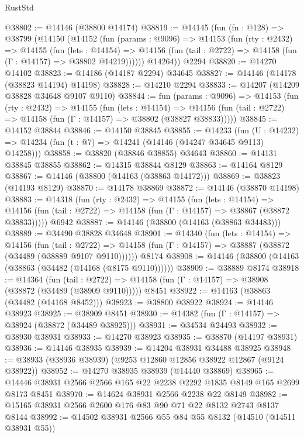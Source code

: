 \begin{lexlean}{RustStd}
\begin{coremodule}
@38802 := @14146 (@38800 @14174)
@38819 := @14145
    (fun (fn : @128) =>
    @38799
      (@14150
        (@14152
          (fun (params : @9096) =>
          @14153
            (fun (rty : @2432) =>
            @14155
              (fun (lets : @14154) =>
              @14156 (fun (tail : @2722) => @14158 (fun (Γ : @14157) => @38802 @14219))))))
        @14264))
    @2294
@38820 := @14270 @14102
@38823 := @14186 (@14187 @2294) @34645
@38827 := @14146 (@14178 (@38823 @14194) @14198)
@38828 := @14210 @2294
@38833 := @14207 (@14209 @38828 @34648 @9107 @9110)
@38844 := fun (params : @9096) =>
  @14153
    (fun (rty : @2432) =>
    @14155
      (fun (lets : @14154) =>
      @14156 (fun (tail : @2722) => @14158 (fun (Γ : @14157) => @38802 (@38827 @38833)))))
@38845 := @14152 @38844
@38846 := @14150 @38845
@38855 := @14233
    (fun (U : @14232) => @14234 (fun (t : @7) => @14241 (@14146 (@14247 @34645 @9113) @14258)))
@38858 := @38820 (@38846 @38855) @34643
@38860 := @14131 @38845 @38855
@38862 := @14315 @38844 @8129
@38863 := @14164 @8129
@38867 := @14146 (@38800 (@14163 (@38863 @14172)))
@38869 := @38823 (@14193 @8129)
@38870 := @14178 @38869
@38872 := @14146 (@38870 @14198)
@38883 := @14318
    (fun (rty : @2432) =>
    @14155
      (fun (lets : @14154) =>
      @14156 (fun (tail : @2722) => @14158 (fun (Γ : @14157) => @38867 (@38872 @38833)))))
    @6942
@38887 := @14146 (@38800 (@14163 (@38863 @34483)))
@38889 := @34490 @38828 @34648
@38901 := @14340
    (fun (lets : @14154) =>
    @14156
      (fun (tail : @2722) =>
      @14158 (fun (Γ : @14157) => @38887 (@38872 (@34489 (@38889 @9107 @9110))))))
    @8174
@38908 := @14146 (@38800 (@14163 (@38863 (@34482 (@14168 (@8175 @9110))))))
@38909 := @38889 @8174
@38918 := @14364
    (fun (tail : @2722) => @14158 (fun (Γ : @14157) => @38908 (@38872 (@34489 (@38909 @9110)))))
    @8451
@38922 := @14163 (@38863 (@34482 (@14168 @8452)))
@38923 := @38800 @38922
@38924 := @14146 @38923
@38925 := @38909 @8451
@38930 := @14382 (fun (Γ : @14157) => @38924 (@38872 (@34489 @38925)))
@38931 := @34534 @24493
@38932 := @38930 @38931
@38933 := @14270 @38923
@38935 := @38870 (@14197 @38931)
@38936 := @14146 @38935
@38939 := @14204 @38931 @34488 @38925
@38948 := @38933 (@38936 @38939) (@9253 @12860 @12856 @38922 @12867 (@9124 @38922))
@38952 := @14270 @38935 @38939 (@14440 @38869)
@38965 := @14446 @38931 @2566 @2566 @165 @22 @2238 @2292 @1835 @8149 @165 @2699 @8173 @8451
@38970 := @14624 @38931 @2566 @2238 @22 @8149
@38982 := @15165 @38931 @2566 @2600 @176 @83 @90 @71 @22 @8132 @2743 @8137 @8144
@38992 := @14502 @38931 @2566 @55 @84 @55 @8132 (@14510 (@14511 @38931 @55))

\end{coremodule}
\end{lexlean}
